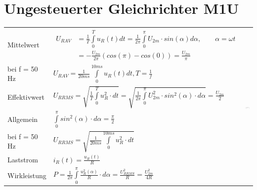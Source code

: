 \section{Ungesteuerter Gleichrichter M1U}


\begin{tabu}{|l|l|p{0.3\textwidth}}
  Mittelwert
  	& $ \begin{aligned}
  			U_{R AV} &= \frac{1}{T}\int\limits_{0}^{T}u_{R}(t)dt = \frac{1}{2\pi}\int\limits_{0}^{\pi}U_{2m} \cdot sin(\alpha)d\alpha, \qquad \alpha = \omega t\\
  					&= -\frac{U_{2m}}{2\pi}(cos(\pi)-cos(0))= \frac{U_{2m}}{\pi}
  		\end{aligned}$
  	& \\
  bei f = 50 Hz 
  	& $U_{R AV} = \frac{1}{20 ms}\int\limits_{0}^{10 ms}u_{R}(t)dt, T = \frac{1}{f}$ &\\
  Effektivwert 
  	& $U_{R RMS} = \sqrt{\frac{1}{T}\int\limits_{0}^{T}u_{R}^2 \cdot dt} = \sqrt{\frac{1}{2\pi}\int\limits_{0}^{\pi}U_{2m}^2 \cdot sin^2(\alpha) \cdot d\alpha} = \frac{U_{2m}}{2}$ &\\
  Allgemein 
  	& $\int\limits_{0}^{\pi}sin^2(\alpha) \cdot d\alpha = \frac{\pi}{2}$&\\
  bei f = 50 Hz 
  	& $U_{R RMS} = \sqrt{\frac{1}{20 ms}\int\limits_{0}^{10 ms}u_{R}^2 \cdot dt}$&\\
  Laststrom 
  	& $i_{R}(t) = \frac{u_{R}(t)}{R}$&\\
  Wirkleistung 
  	& $P = \frac{1}{2\pi}\int\limits_{0}^{\pi}\frac{u_{R}^2(\alpha)}{R} \cdot d\alpha = \frac{U_{R RMS}^2}{R} = \frac{U_{2m}^2}{4R}$&\\
\end{tabu}
